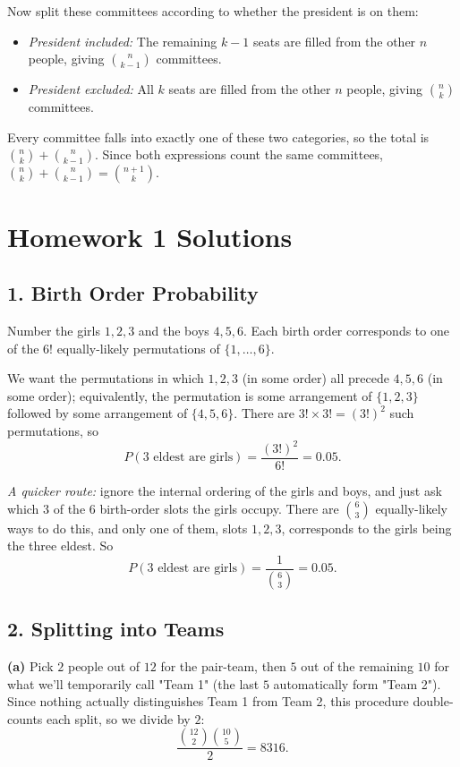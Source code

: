 \documentclass{article}
\begin{document}
Now split these committees according to whether the president is on them:
\begin{itemize}
\item \emph{President included:} The remaining $k-1$ seats are filled from the other $n$ people, giving $\binom{n}{k-1}$ committees.
\item \emph{President excluded:} All $k$ seats are filled from the other $n$ people, giving $\binom{n}{k}$ committees.
\end{itemize}
Every committee falls into exactly one of these two categories, so the total is $\binom{n}{k}+\binom{n}{k-1}$. Since both expressions count the same committees, $\binom{n}{k}+\binom{n}{k-1} = \binom{n+1}{k}$.

\bigskip
\section*{Homework 1 Solutions}

\subsection*{1. Birth Order Probability}

Number the girls $1,2,3$ and the boys $4,5,6$. Each birth order corresponds to one of the $6!$ equally-likely permutations of $\{1,\dots,6\}$.

We want the permutations in which $1,2,3$ (in some order) all precede $4,5,6$ (in some order); equivalently, the permutation is some arrangement of $\{1,2,3\}$ followed by some arrangement of $\{4,5,6\}$. There are $3! \times 3! = (3!)^2$ such permutations, so
$$P(\text{3 eldest are girls}) = \frac{(3!)^2}{6!} = 0.05.$$

\emph{A quicker route:} ignore the internal ordering of the girls and boys, and just ask which $3$ of the $6$ birth-order slots the girls occupy. There are $\binom{6}{3}$ equally-likely ways to do this, and only one of them, slots $1,2,3$, corresponds to the girls being the three eldest. So
$$P(\text{3 eldest are girls}) = \frac{1}{\binom{6}{3}} = 0.05.$$

\subsection*{2. Splitting into Teams}

\textbf{(a)} Pick $2$ people out of $12$ for the pair-team, then $5$ out of the remaining $10$ for what we'll temporarily call "Team 1" (the last $5$ automatically form "Team 2"). Since nothing actually distinguishes Team 1 from Team 2, this procedure double-counts each split, so we divide by $2$:
$$\frac{\binom{12}{2}\binom{10}{5}}{2} = 8316.$$
\end{document}
